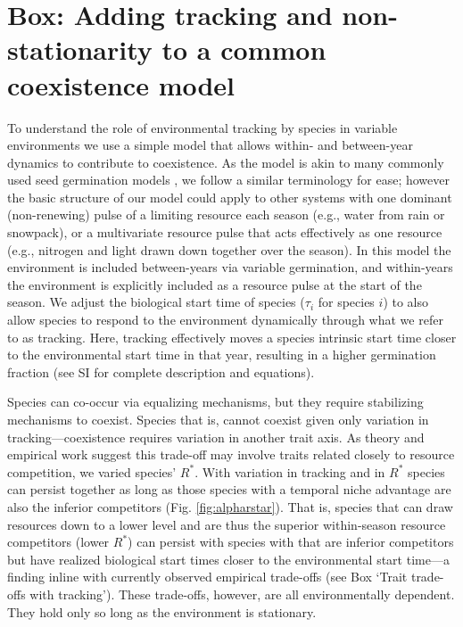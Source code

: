 \documentclass[11pt,letterpaper]{article}
\begin{document}
\section{Box: Adding tracking and non-stationarity to a common coexistence model} %
To understand the role of environmental tracking by species in variable environments we use a simple model that allows within- and between-year dynamics to contribute to coexistence. As the model is akin to many commonly used seed germination models \citep{Chesson:2004eo}, we follow a similar terminology for ease; however the basic structure of our model could apply to other systems with one dominant (non-renewing) pulse of a limiting resource each season (e.g., water from rain or snowpack), or a multivariate resource pulse that acts effectively as one resource (e.g., nitrogen and light drawn down together over the season). In this model the environment is included between-years via variable germination, and within-years the environment is explicitly included as a resource pulse at the start of the season. We adjust the biological start time of species ($\tau_i$ for species $i$) to also allow species to respond to the environment dynamically through what we refer to as tracking. Here, tracking effectively moves a species intrinsic start time closer to the environmental start time in that year, resulting in a higher germination fraction (see SI for complete description and equations).

Species can co-occur via equalizing mechanisms, but they require stabilizing mechanisms to coexist. Species that is, cannot coexist given only variation in tracking---coexistence requires variation in another trait axis. As theory and empirical work suggest this trade-off may involve traits related closely to resource competition, we varied species' $R^*$. With variation in tracking and in $R^*$ species can persist together as long as those species with a temporal niche advantage are also the inferior competitors (Fig. \ref{fig:alpharstar}). That is, species that can draw resources down to a lower level and are thus the superior within-season resource competitors (lower $R^*$) can persist with species with that are inferior competitors but have realized biological start times closer to the environmental start time---a finding inline with currently observed empirical trade-offs (see Box `Trait trade-offs with tracking'). These trade-offs, however, are all environmentally dependent. They hold only so long as the environment is stationary. 
\end{document}
